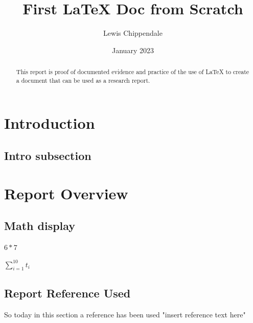 \documentclass{report}
\title{First LaTeX Doc from Scratch}
\author{Lewis Chippendale}
\date{January 2023}
\begin{document}
\maketitle


\tableofcontents

\begin{abstract}
This report is proof of documented evidence and practice of the use of LaTeX to create a document that can be used as a research report.
\end{abstract}

\chapter{Introduction}
\lipsum[1] %
\section{Intro subsection}
\lipsum[2] %

\chapter{Report Overview}
\lipsum[3]

\section{Math display}
$6*7$

$\sum_{i=1}^{10} t_i$


\section{Report Reference Used}
So today in this section a reference has been used "insert reference text here" \parencite{1}

\printbibliography  
\end{document}
